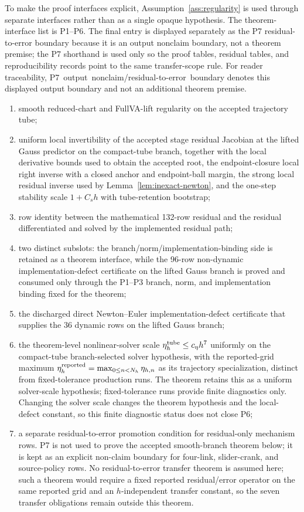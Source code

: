 \documentclass[preprint,12pt]{elsarticle}
\begin{document}
\noindent
To make the proof interfaces explicit, Assumption~\ref{ass:regularity} is used through separate
interfaces rather than as a single opaque hypothesis.  The theorem-interface
list is P1--P6.  The final entry is displayed separately as the P7
residual-to-error boundary because it is an output nonclaim boundary, not a
theorem premise; the P7 shorthand is used only so the proof tables,
residual tables, and reproducibility records point to the same transfer-scope
rule.
For reader traceability, \mbox{P7 output nonclaim/residual-to-error boundary}
denotes this displayed output boundary and not an additional theorem premise.
\begin{enumerate}
  \item[P1.] smooth reduced-chart and FullVA-lift regularity on the accepted
  trajectory tube;
  \item[P2.] uniform local invertibility of the accepted stage residual
  Jacobian at the lifted Gauss predictor on the compact-tube branch,
  together with the local derivative bounds used to obtain the accepted root,
  the
  endpoint-closure local right inverse with a closed anchor and endpoint-ball
  margin, the strong local residual inverse used by
  Lemma~\ref{lem:inexact-newton}, and
  the one-step stability scale \(1+C_s h\) with tube-retention bootstrap;
  \item[P3.] row identity between the mathematical 132-row residual and the
  residual differentiated and solved by the implemented residual path;
  \item[P4.] two distinct subslots: the branch/norm/implementation-binding
  side is retained as a theorem interface, while the 96-row non-dynamic
  implementation-defect certificate on the lifted Gauss branch is proved and
  consumed only through the P1--P3 branch, norm, and implementation binding
  fixed for the theorem;
  \item[P5.] the discharged direct Newton--Euler implementation-defect
  certificate that supplies the 36 dynamic rows on the lifted Gauss branch;
  \item[P6.] the theorem-level nonlinear-solver scale
  \(\eta_h^{\rm tube}\le c_\eta h^7\) uniformly on the compact-tube
  branch-selected solver hypothesis, with the reported-grid maximum
  \(\eta_h^{\rm reported}=\max_{0\le n<N_h}\eta_{h,n}\) as its trajectory specialization,
  distinct from fixed-tolerance production runs.  The theorem retains this as
  a uniform solver-scale hypothesis; fixed-tolerance runs provide finite
  diagnostics only.  Changing the solver scale changes the theorem hypothesis
  and the local-defect constant, so this finite diagnostic status does not
  close P6;
  \item[Output boundary (P7 boundary).] a separate residual-to-error
  promotion condition for residual-only mechanism rows. P7 is not used to
  prove the accepted smooth-branch theorem below; it is kept as an explicit
  non-claim boundary for four-link,
  slider-crank, and source-policy rows.  No residual-to-error transfer theorem
  is assumed here; such a theorem would require a fixed reported residual/error
  operator on the same reported grid and an \(h\)-independent transfer
  constant, so the seven transfer obligations remain outside this theorem.
\end{enumerate}
\end{document}

